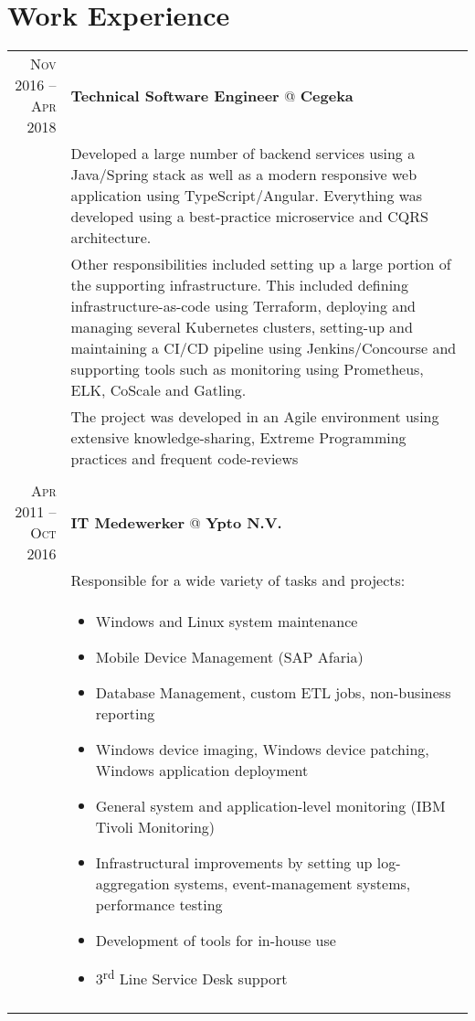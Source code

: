 \documentclass[a4paper,10pt]{article}
\begin{document}
\section{\textcolor{awesome-red}{Wor}k Experience}
	\begin{tabular}{r|p{11cm}}
	\textsc{Nov 2016 – Apr 2018} & \textbf{Technical Software Engineer} @ \textbf{Cegeka} \\ 
	& \footnotesize{Developed a large number of backend services using a Java/Spring stack as well as a modern responsive web application using TypeScript/Angular. Everything was developed using a best-practice microservice and CQRS architecture.}\\
	& \footnotesize{Other responsibilities included setting up a large portion of the supporting infrastructure. This included defining infrastructure-as-code using Terraform, deploying and managing several Kubernetes clusters, setting-up and maintaining a CI/CD pipeline using Jenkins/Concourse and supporting tools such as monitoring using Prometheus, ELK, CoScale and Gatling.}\\
	& \footnotesize{The project was developed in an Agile environment using extensive knowledge-sharing, Extreme Programming practices and frequent code-reviews}\\
	\multicolumn{2}{c}{} \\
	
	\textsc{Apr 2011 – Oct 2016} & \textbf{IT Medewerker} @ \textbf{Ypto N.V.} \\
	& \footnotesize{Responsible for a wide variety of tasks and projects:} \\
	& \begin{minipage} [t] {0.9\textwidth} 
      	\begin{itemize}
      	\item\footnotesize{Windows and Linux system maintenance}
      	\item\footnotesize{Mobile Device Management (SAP Afaria)}
      	\item\footnotesize{Database Management, custom ETL jobs, non-business reporting}
		\item\footnotesize{Windows device imaging, Windows device patching, Windows application deployment}
		\item\footnotesize{General system and application-level monitoring (IBM Tivoli Monitoring)}
		\item\footnotesize{Infrastructural improvements by setting up log-aggregation systems, event-management systems, performance testing}
		\item\footnotesize{Development of tools for in-house use}
		\item\footnotesize{3\textsuperscript{rd} Line Service Desk support}
     	\end{itemize} 
	\end{minipage} \\
	\multicolumn{2}{c}{} \\
\end{tabular}
\end{document}
